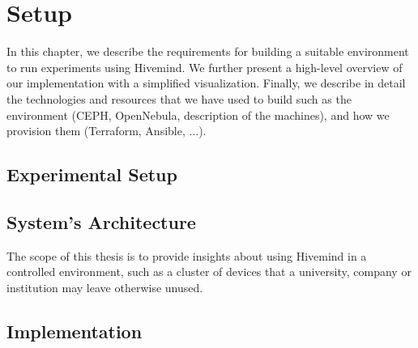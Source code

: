 \chapter{Setup}\label{chapter:setup}

In this chapter, we describe the requirements for building a suitable environment to run experiments using Hivemind. We further
present a high-level overview of our implementation with a simplified visualization. Finally, we describe in detail the technologies
and resources that we have used to build such as the environment (CEPH, OpenNebula, description of the machines), and how we provision them (Terraform, Ansible, ...).

\section{Experimental Setup}

\section{System's Architecture}

The scope of this thesis is to provide insights about using Hivemind in a controlled environment, such as a cluster of devices that a university, company or institution may leave otherwise unused.

\section{Implementation}
